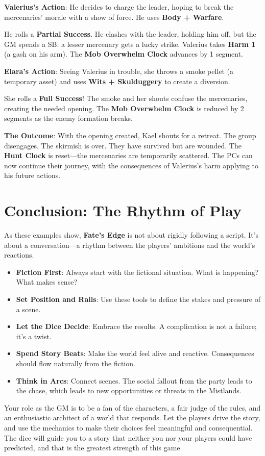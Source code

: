 \textbf{Valerius's Action}: He decides to charge the leader, hoping to break the mercenaries' morale with a show of force. He uses \textbf{Body + Warfare}.

He rolls a \textbf{Partial Success}. He clashes with the leader, holding him off, but the GM spends a SB: a lesser mercenary gets a lucky strike. Valerius takes \textbf{Harm 1} (a gash on his arm). The \textbf{Mob Overwhelm Clock} advances by 1 segment.

\textbf{Elara's Action}: Seeing Valerius in trouble, she throws a smoke pellet (a temporary asset) and uses \textbf{Wits + Skulduggery} to create a diversion.

She rolls a \textbf{Full Success}! The smoke and her shouts confuse the mercenaries, creating the needed opening. The \textbf{Mob Overwhelm Clock} is reduced by 2 segments as the enemy formation breaks.

\textbf{The Outcome}: With the opening created, Kael shouts for a retreat. The group disengages. The skirmish is over. They have survived but are wounded. The \textbf{Hunt Clock} is reset---the mercenaries are temporarily scattered. The PCs can now continue their journey, with the consequences of Valerius's harm applying to his future actions.

\section*{Conclusion: The Rhythm of Play}

As these examples show, \textbf{Fate's Edge} is not about rigidly following a script. It's about a conversation---a rhythm between the players' ambitions and the world's reactions.

\begin{tcolorbox}[title=The GM's Mantra, colback=green!5!white, colframe=green!75!black, fonttitle=\bfseries]
\begin{itemize}
    \item \textbf{Fiction First}: Always start with the fictional situation. What is happening? What makes sense?
    \item \textbf{Set Position and Rails}: Use these tools to define the stakes and pressure of a scene.
    \item \textbf{Let the Dice Decide}: Embrace the results. A complication is not a failure; it's a twist.
    \item \textbf{Spend Story Beats}: Make the world feel alive and reactive. Consequences should flow naturally from the fiction.
    \item \textbf{Think in Arcs}: Connect scenes. The social fallout from the party leads to the chase, which leads to new opportunities or threats in the Mistlands.
\end{itemize}
\end{tcolorbox}

Your role as the GM is to be a fan of the characters, a fair judge of the rules, and an enthusiastic architect of a world that responds. Let the players drive the story, and use the mechanics to make their choices feel meaningful and consequential. The dice will guide you to a story that neither you nor your players could have predicted, and that is the greatest strength of this game.

